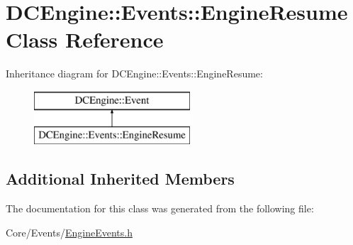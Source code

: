 \hypertarget{classDCEngine_1_1Events_1_1EngineResume}{\section{D\-C\-Engine\-:\-:Events\-:\-:Engine\-Resume Class Reference}
\label{classDCEngine_1_1Events_1_1EngineResume}
}
Inheritance diagram for D\-C\-Engine\-:\-:Events\-:\-:Engine\-Resume\-:\begin{figure}[H]
\begin{center}
\leavevmode
\includegraphics[height=2.000000cm]{classDCEngine_1_1Events_1_1EngineResume}
\end{center}
\end{figure}
\subsection*{Additional Inherited Members}


The documentation for this class was generated from the following file\-:\begin{DoxyCompactItemize}
\item 
Core/\-Events/\hyperlink{EngineEvents_8h}{Engine\-Events.\-h}\end{DoxyCompactItemize}
